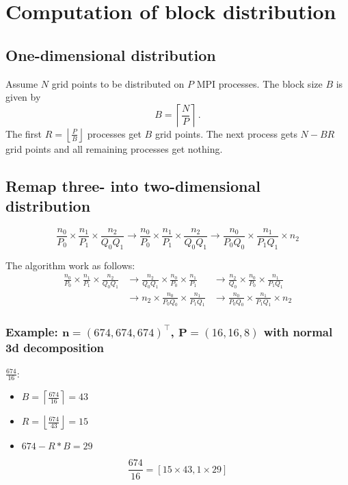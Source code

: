 \section{Computation of block distribution}
\subsection{One-dimensional distribution}
Assume $N$ grid points to be distributed on $P$ MPI processes. The block size $B$ is given by
\begin{equation*}
  B = \left\lceil \frac{N}{P} \right\rceil\,.
\end{equation*}
The first $R=\left\lfloor\frac{P}{B}\right\rfloor$ processes get $B$ grid points. The next process gets $N-BR$ grid points and all remaining processes get nothing.


\subsection{Remap three- into two-dimensional distribution}
\begin{equation*}
  \frac{n_0}{P_0} \times \frac{n_1}{P_1} \times \frac{n_2}{Q_0Q_1}
  \to
  \frac{n_0}{P_0} \times \frac{n_1}{P_1} \times \frac{n_2}{Q_0Q_1}
  \to
  \frac{n_0}{P_0Q_0} \times \frac{n_1}{P_1Q_1} \times n_2
\end{equation*}

The algorithm work as follows:
\begin{align*}
  \frac{n_0}{P_0} \times \frac{n_1}{P_1} \times \frac{n_2}{Q_0Q_1}
  &\to
  \frac{n_2}{Q_0Q_1} \times \frac{n_0}{P_0} \times \frac{n_1}{P_1}
  &\to
  \frac{n_2}{Q_0} \times \frac{n_0}{P_0} \times \frac{n_1}{P_1Q_1} \\
  &\to
  n_2 \times \frac{n_0}{P_0Q_0} \times \frac{n_1}{P_1Q_1}
  &\to
  \frac{n_0}{P_0Q_0} \times \frac{n_1}{P_1Q_1} \times n_2
\end{align*}

\subsubsection{Example: $\mathbf n=(674, 674, 674)^\top$, $\mathbf P = (16,16,8)$ with normal 3d decomposition}
$\frac{674}{16}$:
\begin{itemize}
 \item $B = \left\lceil \frac{674}{16} \right\rceil = 43$
 \item $R = \left\lfloor \frac{674}{43} \right\rfloor = 15$
 \item $674 - R*B = 29$ 
\end{itemize}
\begin{equation*}
  \frac{674}{16} = \left[15\times 43, 1\times 29 \right]
\end{equation*}

